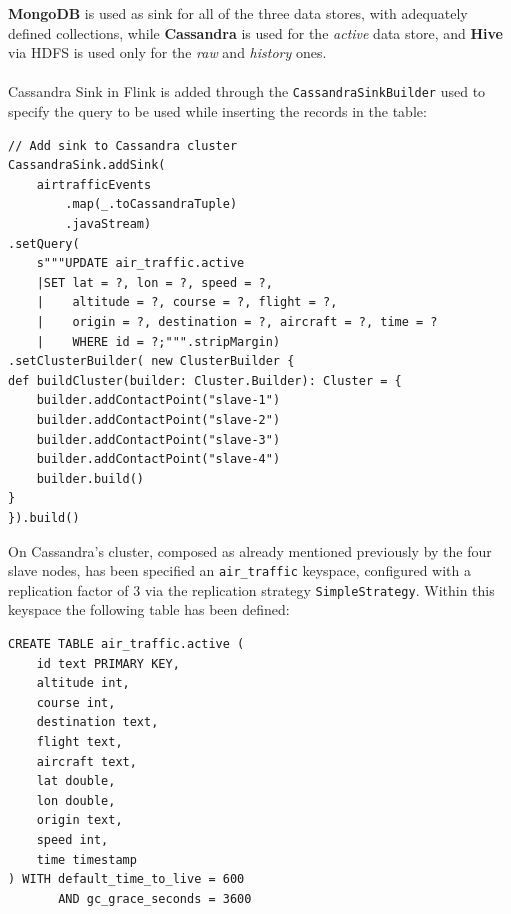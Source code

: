 \textbf{MongoDB} is used as sink for all of the three data stores, with adequately defined collections, while \textbf{Cassandra} is used for the \textit{active} data store, and \textbf{Hive} via HDFS is used only for the \textit{raw} and \textit{history} ones.
\\\\
Cassandra Sink in Flink is added through the \texttt{CassandraSinkBuilder} used to specify the query to be used while inserting the records in the table:

\begin{verbatim}
// Add sink to Cassandra cluster
CassandraSink.addSink(
    airtrafficEvents
        .map(_.toCassandraTuple)
        .javaStream)
.setQuery(
    s"""UPDATE air_traffic.active
    |SET lat = ?, lon = ?, speed = ?,
    |    altitude = ?, course = ?, flight = ?,
    |    origin = ?, destination = ?, aircraft = ?, time = ?
    |    WHERE id = ?;""".stripMargin)
.setClusterBuilder( new ClusterBuilder {
def buildCluster(builder: Cluster.Builder): Cluster = {   
    builder.addContactPoint("slave-1")
    builder.addContactPoint("slave-2")
    builder.addContactPoint("slave-3")
    builder.addContactPoint("slave-4")
    builder.build()
}
}).build()
\end{verbatim}

On Cassandra's cluster, composed as already mentioned previously by the four slave nodes, has been specified an \texttt{air\_traffic} keyspace, configured with a replication factor of 3 via the replication strategy \texttt{SimpleStrategy}. Within this keyspace the following table has been defined:

\begin{verbatim}
CREATE TABLE air_traffic.active (
    id text PRIMARY KEY,
    altitude int,
    course int,
    destination text,
    flight text,
    aircraft text,
    lat double,
    lon double,
    origin text,
    speed int,
    time timestamp
) WITH default_time_to_live = 600
       AND gc_grace_seconds = 3600
\end{verbatim}

